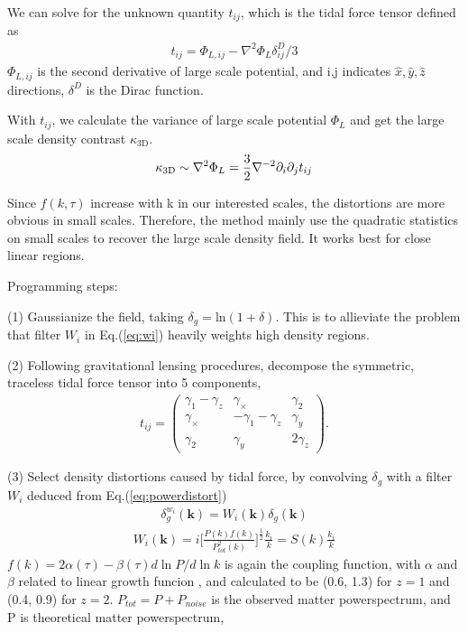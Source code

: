 We can solve for the unknown quantity $t_{ij}$, 
which is the tidal force tensor defined as 
\begin{eqnarray}
\label{eq:tij}
t_{ij}=\Phi_{L,ij}-\nabla^2\Phi_L\delta^D_{ij}/3
\end{eqnarray}
$\Phi_{L,ij}$ is the second derivative of large scale potential, 
and i,j indicates $\hat x,\hat y,\hat z$ directions, 
$\delta^D$ is the Dirac function.

With $t_{ij}$, we calculate the variance of large scale potential $\Phi_L$  
and get the large scale density contrast $\kappa_\mathrm{3D}$.
\begin{eqnarray}
    \label{eq:largepoten}
    \kappa_\mathrm{3D}\sim\nabla^2\Phi_L=\frac{3}{2}\nabla^{-2}\partial_i\partial_j t_{ij}
\end{eqnarray}

Since $f(k,\tau)$ increase with k in our interested scales, 
the distortions are more obvious in small scales. 
Therefore, the method mainly use the quadratic statistics on small scales to recover the large scale density field. 
It works best for close linear regions.


Programming steps:\noindent

(1) Gaussianize the field, taking 
$\delta_g=\mathrm{ln}(1+\delta)$. 
This is to allieviate the problem that filter $W_i$ in Eq.(\ref{eq:wi}) heavily weights high density regions.

(2) Following gravitational lensing procedures, decompose the symmetric, traceless tidal force tensor into 5 components, 
\begin{eqnarray}
t_{ij}=\left( \begin{array}{ccc}
\gamma_{1}-\gamma_{z} & \gamma_{\times} & \gamma_{2}\\
\gamma_{\times} & -\gamma_{1}-\gamma_{z} & \gamma_{y}\\
\gamma_{2} & \gamma_{y} & 2\gamma_z
\end{array} \right).
\end{eqnarray}

(3) Select density distortions caused by tidal force, 
by convolving $\delta_g$ with a filter $W_i$ 
deduced from Eq.(\ref{eq:powerdistort}) 
\begin{eqnarray}
\delta^{w_i}_g(\bm{k})=W_i(\bm{k})\delta_g(\bm{k}) 
\end{eqnarray}
\begin{eqnarray}
\label{eq:wi}
W_i(\bm{k})=i \bigg[\frac{P(k)f(k)}{P_{tot}^2(k)}\bigg]^{\frac{1}{2}}\frac{k_i}{k}
=S(k)\frac{k_i}{k}\nonumber
\end{eqnarray}
$f(k)=2\alpha(\tau)-\beta(\tau)d\ln P/d\ln k$ is again the coupling function, 
with $\alpha$ and $\beta$ related to linear growth funcion \cite{2015:zhu}, 
and calculated to be (0.6, 1.3) for $z=1$ and (0.4, 0.9) for $z=2$.
$P_{tot}=P+P_{noise}$ is the observed matter powerspectrum, 
and P is theoretical matter powerspectrum,

